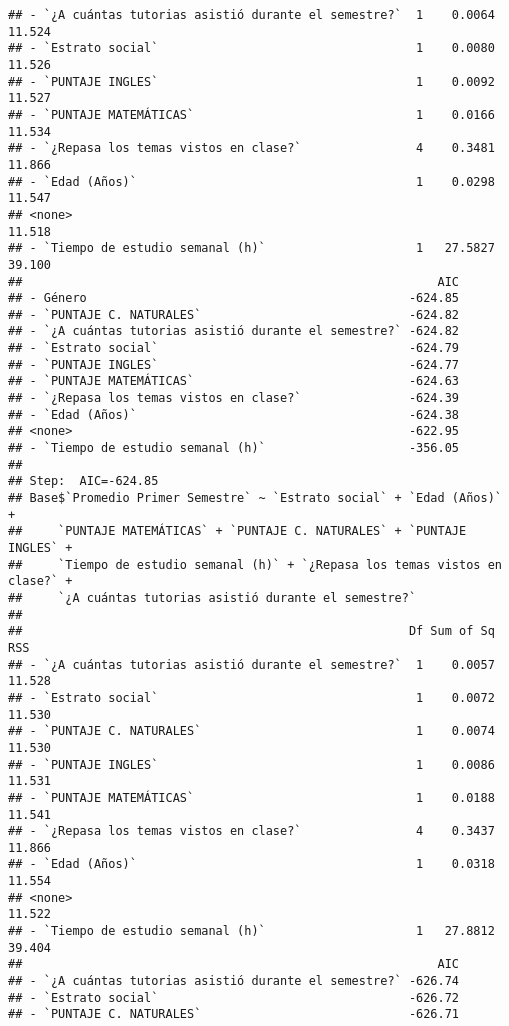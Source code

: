 \documentclass[
  man]{apa6}
\begin{document}
\begin{verbatim}
## - `¿A cuántas tutorias asistió durante el semestre?`  1    0.0064 11.524
## - `Estrato social`                                    1    0.0080 11.526
## - `PUNTAJE INGLES`                                    1    0.0092 11.527
## - `PUNTAJE MATEMÁTICAS`                               1    0.0166 11.534
## - `¿Repasa los temas vistos en clase?`                4    0.3481 11.866
## - `Edad (Años)`                                       1    0.0298 11.547
## <none>                                                            11.518
## - `Tiempo de estudio semanal (h)`                     1   27.5827 39.100
##                                                          AIC
## - Género                                             -624.85
## - `PUNTAJE C. NATURALES`                             -624.82
## - `¿A cuántas tutorias asistió durante el semestre?` -624.82
## - `Estrato social`                                   -624.79
## - `PUNTAJE INGLES`                                   -624.77
## - `PUNTAJE MATEMÁTICAS`                              -624.63
## - `¿Repasa los temas vistos en clase?`               -624.39
## - `Edad (Años)`                                      -624.38
## <none>                                               -622.95
## - `Tiempo de estudio semanal (h)`                    -356.05
## 
## Step:  AIC=-624.85
## Base$`Promedio Primer Semestre` ~ `Estrato social` + `Edad (Años)` + 
##     `PUNTAJE MATEMÁTICAS` + `PUNTAJE C. NATURALES` + `PUNTAJE INGLES` + 
##     `Tiempo de estudio semanal (h)` + `¿Repasa los temas vistos en clase?` + 
##     `¿A cuántas tutorias asistió durante el semestre?`
## 
##                                                      Df Sum of Sq    RSS
## - `¿A cuántas tutorias asistió durante el semestre?`  1    0.0057 11.528
## - `Estrato social`                                    1    0.0072 11.530
## - `PUNTAJE C. NATURALES`                              1    0.0074 11.530
## - `PUNTAJE INGLES`                                    1    0.0086 11.531
## - `PUNTAJE MATEMÁTICAS`                               1    0.0188 11.541
## - `¿Repasa los temas vistos en clase?`                4    0.3437 11.866
## - `Edad (Años)`                                       1    0.0318 11.554
## <none>                                                            11.522
## - `Tiempo de estudio semanal (h)`                     1   27.8812 39.404
##                                                          AIC
## - `¿A cuántas tutorias asistió durante el semestre?` -626.74
## - `Estrato social`                                   -626.72
## - `PUNTAJE C. NATURALES`                             -626.71

\end{verbatim}
\end{document}
